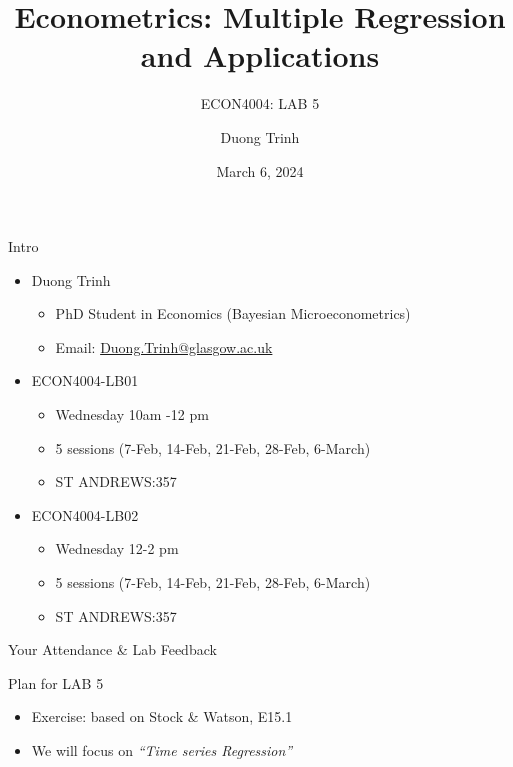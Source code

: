 \documentclass[
  10pt,
  ignorenonframetext,
]{beamer}
\title{Econometrics: Multiple Regression and Applications}
\subtitle{ECON4004: LAB 5}
\author{Duong Trinh}
\date{March 6, 2024}
\institute{University of Glasgow}
\providecommand{\tightlist}{%
  \setlength{\itemsep}{0pt}\setlength{\parskip}{0pt}}
\begin{document}
\frame{\titlepage}

\begin{frame}{Intro}
\protect\hypertarget{intro}{}
\begin{itemize}
\tightlist
\item
  Duong Trinh

  \begin{itemize}
  \tightlist
  \item
    PhD Student in Economics (Bayesian Microeconometrics)
  \item
    Email: \underline{Duong.Trinh@glasgow.ac.uk}
  \end{itemize}
\end{itemize}

\vspace{3mm}

\begin{itemize}
\tightlist
\item
  ECON4004-LB01

  \begin{itemize}
  \tightlist
  \item
    Wednesday 10am -12 pm
  \item
    5 sessions (7-Feb, 14-Feb, 21-Feb, 28-Feb, 6-March)
  \item
    ST ANDREWS:357
  \end{itemize}
\item
  ECON4004-LB02

  \begin{itemize}
  \tightlist
  \item
    Wednesday 12-2 pm
  \item
    5 sessions (7-Feb, 14-Feb, 21-Feb, 28-Feb, 6-March)
  \item
    ST ANDREWS:357
  \end{itemize}
\end{itemize}
\end{frame}

\begin{frame}{Your Attendance \& Lab Feedback}
\protect\hypertarget{your-attendance-lab-feedback}{}
\end{frame}

\begin{frame}{Plan for LAB 5}
\protect\hypertarget{plan-for-lab-5}{}
\begin{itemize}
\item
  Exercise: based on Stock \& Watson, E15.1
\item
  We will focus on \emph{``Time series Regression''}
\end{itemize}
\end{frame}
\end{document}

